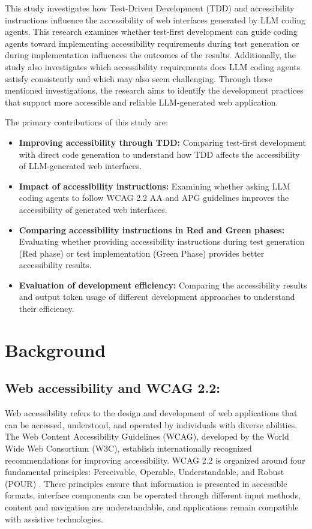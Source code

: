 \documentclass[conference]{IEEEtran}
\begin{document}
This study investigates how Test-Driven Development (TDD) and accessibility instructions influence the accessibility of web interfaces generated by LLM coding agents. This research examines whether test-first development can guide coding agents toward implementing accessibility requirements during test generation or during implementation influences the outcomes of the results. Additionally, the study also investigates which accessibility requirements does LLM coding agents satisfy consistently and which may also seem challenging. Through these mentioned investigations, the research aims to identify the development practices that support more accessible and reliable LLM-generated web application.

The primary contributions of this study are:
\begin{itemize}
  \item \textbf{Improving accessibility through TDD:} Comparing test-first development with direct code generation to understand how TDD affects the accessibility of LLM-generated web interfaces.
  \item \textbf{Impact of accessibility instructions:} Examining whether asking LLM coding agents to follow WCAG 2.2 AA and APG guidelines improves the accessibility of generated web interfaces.
  \item \textbf{Comparing accessibility instructions in Red and Green phases:} Evaluating whether providing accessibility instructions during test generation (Red phase) or test implementation (Green Phase) provides better accessibility results.
  \item \textbf{Evaluation of development efficiency:} Comparing the accessibility results and output token usage of different development approaches to understand their efficiency.
\end{itemize}

\section{Background}

\subsection{Web accessibility and WCAG 2.2:}

Web accessibility refers to the design and development of web applications that can be accessed, understood, and operated by individuals with diverse abilities. The Web Content Accessibility Guidelines (WCAG), developed by the World Wide Web Consortium (W3C), establish internationally recognized recommendations for improving accessibility. WCAG 2.2 is organized around four fundamental principles: Perceivable, Operable, Understandable, and Robust (POUR) \cite{wcag2022}. These principles ensure that information is presented in accessible formats, interface components can be operated through different input methods, content and navigation are understandable, and applications remain compatible with assistive technologies.
\end{document}
